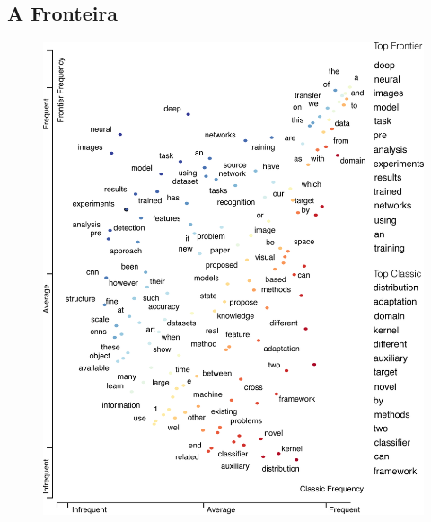 \documentclass[sigconf]{acmart}
\begin{document}
  \subsection{A Fronteira}\label{fronteira}
  \lipsum[2]
  \begin{figure}
    \includegraphics[width=\columnwidth]{frontier3.pdf}
    \caption{} \label{fig:scatterText}
  \end{figure}
  \begin{figure}
    \caption{} \label{fig:bicoupling}
  \end{figure}
\end{document}
